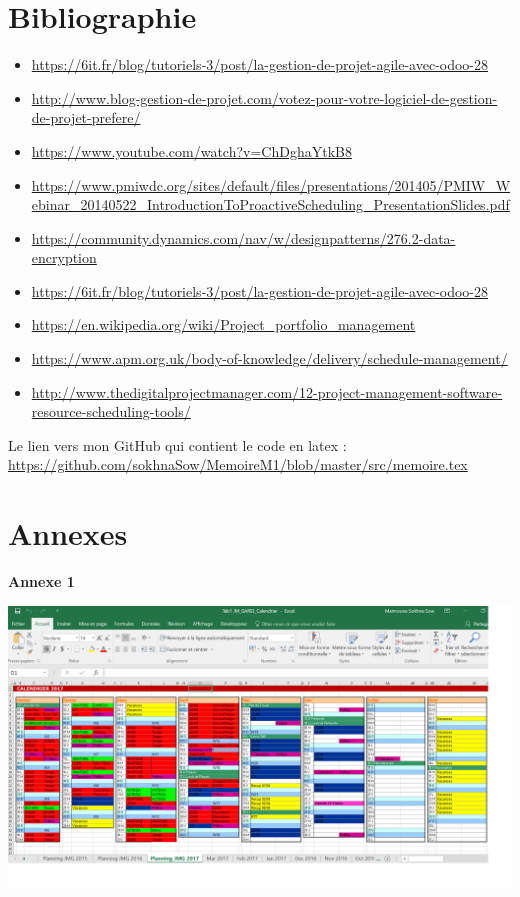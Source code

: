 \documentclass[11pt]{report}
\begin{document}
\section{Bibliographie}
\begin{itemize}
	\item \url{https://6it.fr/blog/tutoriels-3/post/la-gestion-de-projet-agile-avec-odoo-28}
	\\
	\item \url{http://www.blog-gestion-de-projet.com/votez-pour-votre-logiciel-de-gestion-de-projet-prefere/}
	\\
	\item \url{https://www.youtube.com/watch?v=ChDghaYtkB8}
	\\
	\item \url{https://www.pmiwdc.org/sites/default/files/presentations/201405/PMIW_Webinar_20140522_IntroductionToProactiveScheduling_PresentationSlides.pdf}
	\\
	\item \url{https://community.dynamics.com/nav/w/designpatterns/276.2-data-encryption}
	\\
	\item \url{https://6it.fr/blog/tutoriels-3/post/la-gestion-de-projet-agile-avec-odoo-28}
	\\
	\item \url{https://en.wikipedia.org/wiki/Project_portfolio_management}
	\\
	\item \url{https://www.apm.org.uk/body-of-knowledge/delivery/schedule-management/}
	\\
	\item \url{http://www.thedigitalprojectmanager.com/12-project-management-software-resource-scheduling-tools/}	
\end{itemize}
\quad

Le lien vers mon GitHub qui contient le code en latex :\\ 
\url{https://github.com/sokhnaSow/MemoireM1/blob/master/src/memoire.tex}

\newpage
\section{Annexes}
\textbf{Annexe 1}
\begin{center}
\includegraphics[scale=0.5]{images/annexe1.png}
\end{center}
\end{document}
